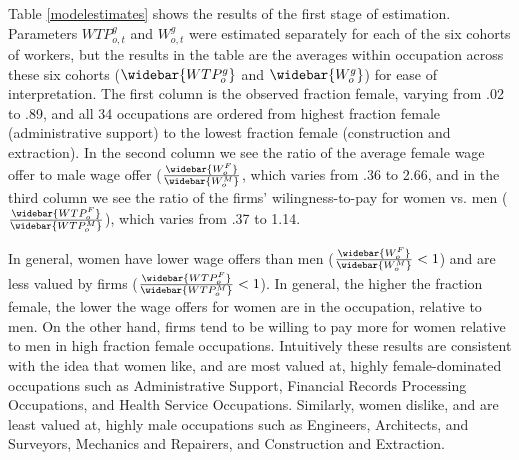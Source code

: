 \documentclass[12pt]{article}
\begin{document}

Table \ref{modelestimates} shows the results of the first stage of estimation. Parameters $WTP^g_{o,t}$ and $W^g_{o,t}$ were estimated separately for each of the six cohorts of workers, but the results in the table are the averages within occupation across these six cohorts ($\widebar{WTP^g_{o}}$ and $\widebar{W^g_{o}}$) for ease of interpretation. The first column is the observed fraction female, varying from .02 to .89, and all 34 occupations are ordered from highest fraction female (administrative support) to the lowest fraction female (construction and extraction). In the second column we see the ratio of the average female wage offer to male wage offer ($  \frac{\widebar{W^F_{o}}}{\widebar{W^M_{o}}}$, which varies from .36 to 2.66, and in the third column we see the ratio of the firms' wilingness-to-pay for women vs. men ($ \frac{\widebar{WTP^F_{o}}}{\widebar{WTP^M_{o}}}$), which varies from .37 to 1.14. 

In general, women have lower wage offers than men ($  \frac{\widebar{W^F_o}}{\widebar{W^M_o}} < 1$) and are less valued by firms ($ \frac{\widebar{WTP^F_o}}{\widebar{WTP^M_o}} < 1$). In general, the higher the fraction female, the lower the wage offers for women are in the occupation, relative to men. On the other hand, firms tend to be willing to pay more for women relative to men in high fraction female occupations. Intuitively these results are consistent with the idea that women like, and are most valued at, highly female-dominated occupations such as Administrative Support, Financial Records Processing Occupations, and Health Service Occupations. Similarly, women dislike, and are least valued at, highly male occupations such as Engineers, Architects, and Surveyors, Mechanics and Repairers, and Construction and Extraction.

\end{document}
